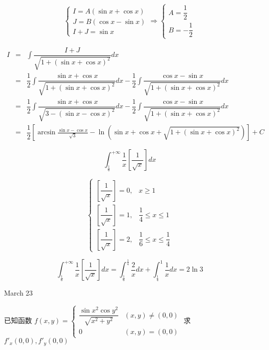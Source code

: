 \begin{solution}
	
	$$\begin{cases}
	  I = A(\sin x +\cos x)\\
	  J = B(\cos x -\sin x)\\
	  I + J = \sin x
	\end{cases}\Rightarrow 
	\begin{cases}
		A = \dfrac{1}{2}\\
		B = -\dfrac{1}{2}
	\end{cases}$$
	
	\begin{eqnarray*}
		I & = & \int\dfrac{I+J}{\sqrt{1+(\sin x+\cos x)^2}}dx\\
		  & = & \dfrac{1}{2}\int\dfrac{\sin x+\cos x}{\sqrt{1+(\sin x+\cos x)^2}}dx - \dfrac{1}{2}\int\dfrac{\cos x-\sin x}{\sqrt{1+(\sin x+\cos x)^2}}dx\\
		  & = & \dfrac{1}{2}\int\dfrac{\sin x+\cos x}{\sqrt{3-(\sin x-\cos x)^2}}dx - \dfrac{1}{2}\int\dfrac{\cos x-\sin x}{\sqrt{1+(\sin x+\cos x)^2}}dx\\
		  & = & \dfrac{1}{2}\left[ \arcsin \frac{\sin x-\cos x}{\sqrt{3}}-\ln\left(\sin x+\cos x+\sqrt{1+(\sin x+\cos x)^2} \right)\right] +C
	\end{eqnarray*}
\end{solution}

\begin{example}[][Exam: 29.4.2]
	$$\int_{\frac{1}{6}}^{+\infty}\dfrac{1}{x}\left[ \dfrac{1}{\sqrt{x}}\right]dx$$
\end{example}

\begin{solution}
	
	$$\begin{cases}
		\left[ \dfrac{1}{\sqrt{x}}\right]=0, &x\geq 1\\
		\left[ \dfrac{1}{\sqrt{x}}\right]=1, &\dfrac{1}{4}\leq x\leq 1\\
		\left[ \dfrac{1}{\sqrt{x}}\right]=2, &\dfrac{1}{6}\leq x\leq \dfrac{1}{4}
	\end{cases}$$
	
	$$\int_{\frac{1}{6}}^{+\infty}\dfrac{1}{x}\left[ \dfrac{1}{\sqrt{x}}\right]dx = 
	\int_{\frac{1}{6}}^{\frac{1}{4}}\dfrac{2}{x}dx+\int_{\frac{1}{4}}^{1}\dfrac{1}{x}dx=2\ln 3$$
\end{solution}

\textcolor{purplea}{March 23}

\begin{example}[][Exam: 29.4.3]
	已知函数 $f(x,y)=
\begin{cases}
	\dfrac{\sin x^2\cos y^2}{\sqrt{x^2+y^2}} & (x,y)\neq (0,0)\\
	0  & (x,y)=(0,0)
\end{cases}$ 求 $f'_{x}(0,0),f'_{y}(0,0)$
\end{example}

